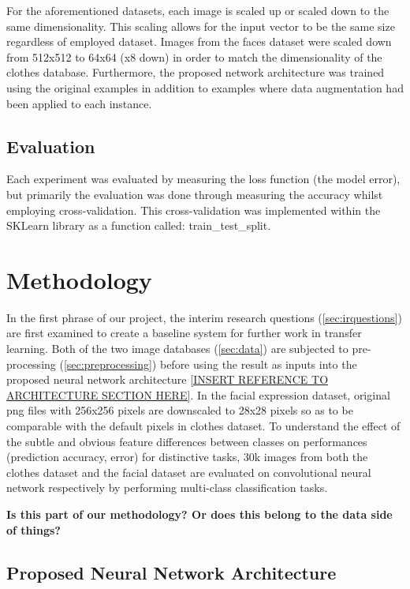 \documentclass{article}
\begin{document}
For the aforementioned datasets, each image is scaled up or scaled down to the same dimensionality. This scaling allows for the input vector to be the same size regardless of employed dataset. Images from the faces dataset were scaled down from 512x512 to 64x64 (x8 down) in order to match the dimensionality of the clothes database. Furthermore, the proposed network architecture was trained using the original examples in addition to examples where data augmentation had been applied to each instance.

\subsection{Evaluation}
\label{sec:evaluation}

Each experiment was evaluated by measuring the loss function (the model error), but primarily the evaluation was done through measuring the accuracy whilst employing cross-validation. This cross-validation was implemented within the SKLearn library as a function called: train_test_split.

\section{Methodology}
\label{sec:methodology}

In the first phrase of our project, the interim research questions (\ref{sec:irquestions}) are first examined to create a baseline system for further work in transfer learning. Both of the two image databases (\ref{sec:data}) are subjected to pre-processing (\ref{sec:preprocessing}) before using the result as inputs into the proposed neural network architecture \ref{INSERT REFERENCE TO ARCHITECTURE SECTION HERE}. In the facial expression dataset, original png files with 256x256 pixels are downscaled to 28x28 pixels so as to be comparable with the default pixels in clothes dataset. To understand the effect of the subtle and obvious feature differences between classes on performances (prediction accuracy, error) for distinctive tasks, 30k images from both the clothes dataset and the facial dataset are evaluated on convolutional neural network respectively by performing multi-class classification tasks.

\textbf{Is this part of our methodology? Or does this belong to the data side of things?}

\subsection{Proposed Neural Network Architecture}
\label{sec:arch}
\end{document}
